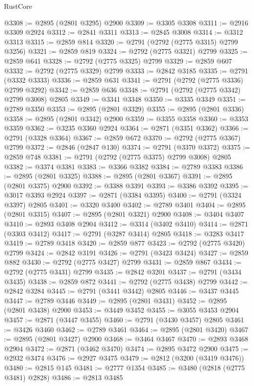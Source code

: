 \begin{lexlean}{RustCore}
\begin{coremodule}
@3308 := @2895 (@2801 @3295) @2900
@3309 := @3305 @3308
@3311 := @2916 @3309 @2924
@3312 := @2841 @3311
@3313 := @2845 @3008
@3314 := @3312 @3313
@3315 := @2859 @814
@3320 := @2791 (@2792 (@2775 @3315) @2799 @3256)
@3321 := @2859 @819
@3324 := @2792 (@2775 @3321) @2799
@3325 := @2859 @641
@3328 := @2792 (@2775 @3325) @2799
@3329 := @2859 @607
@3332 := @2792 (@2775 @3329) @2799
@3333 := @2842 @3185
@3335 := @2791 (@3332 @3333)
@3336 := @2859 @631
@3341 := @2791 (@2792 (@2775 @3336) @2799 @3292)
@3342 := @2859 @636
@3348 := @2791 (@2792 (@2775 @3342) @2799 @3008) @2805
@3349 := @3341 @3348
@3350 := @3335 @3349
@3351 := @2789 @3350
@3353 := @2895 (@2801 @3329)
@3355 := @2895 (@2801 @3336)
@3358 := @2895 (@2801 @3342) @2900
@3359 := @3355 @3358
@3360 := @3353 @3359
@3362 := @3235 @3360 @2924
@3364 := @2871 (@3351 @3362)
@3366 := @2791 (@3328 @3364)
@3367 := @2859 @672
@3370 := @2792 (@2775 @3367) @2799
@3372 := @2846 (@2847 @130)
@3374 := @2791 (@3370 @3372)
@3375 := @2859 @748
@3381 := @2791 (@2792 (@2775 @3375) @2799 @3008) @2805
@3382 := @3374 @3381
@3383 := @3366 @3382
@3384 := @2789 @3383
@3386 := @2895 (@2801 @3325)
@3388 := @2895 (@2801 @3367)
@3391 := @2895 (@2801 @3375) @2900
@3392 := @3388 @3391
@3393 := @3386 @3392
@3395 := @3017 @3393 @2924
@3397 := @2871 (@3384 @3395)
@3400 := @2791 (@3324 @3397) @2805
@3401 := @3320 @3400
@3402 := @2789 @3401
@3404 := @2895 (@2801 @3315)
@3407 := @2895 (@2801 @3321) @2900
@3408 := @3404 @3407
@3410 := @2893 @3408 @2904
@3412 := @3314 (@3402 @3410)
@3414 := @2871 (@3303 @3412)
@3417 := @2791 (@3287 @3414) @2805
@3418 := @3283 @3417
@3419 := @2789 @3418
@3420 := @2859 @877
@3423 := @2792 (@2775 @3420) @2799
@3424 := @2842 @3191
@3426 := @2791 (@3423 @3424)
@3427 := @2859 @882
@3430 := @2792 (@2775 @3427) @2799
@3431 := @2859 @867
@3434 := @2792 (@2775 @3431) @2799
@3435 := @2842 @3201
@3437 := @2791 (@3434 @3435)
@3438 := @2859 @872
@3441 := @2792 (@2775 @3438) @2799
@3442 := @2842 @3284
@3445 := @2791 (@3441 @3442) @2805
@3446 := @3437 @3445
@3447 := @2789 @3446
@3449 := @2895 (@2801 @3431)
@3452 := @2895 (@2801 @3438) @2900
@3453 := @3449 @3452
@3455 := @3055 @3453 @2904
@3457 := @2871 (@3447 @3455)
@3460 := @2791 (@3430 @3457) @2805
@3461 := @3426 @3460
@3462 := @2789 @3461
@3464 := @2895 (@2801 @3420)
@3467 := @2895 (@2801 @3427) @2900
@3468 := @3464 @3467
@3470 := @2893 @3468 @2904
@3472 := @2871 (@3462 @3470)
@3474 := @2895 @3472 @2900
@3475 := @2932 @3474
@3476 := @2927 @3475
@3479 := @2812 (@3200 (@3419 @3476))
@3480 := @2815 @145
@3481 := @2777 @1354
@3485 := @3480 (@2818 (@2775 @3481) @2828)
@3486 := @2813 @3485

\end{coremodule}
\end{lexlean}
